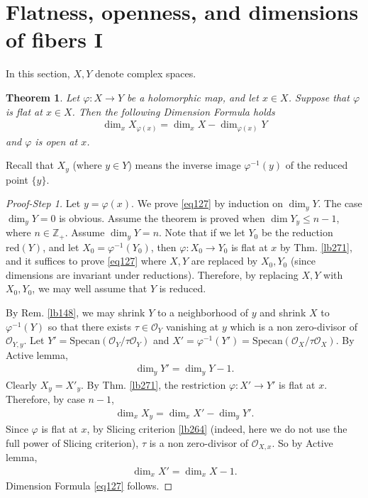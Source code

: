 \documentclass[12pt,b5paper,notitlepage]{report}
\theoremstyle{definition}
\theoremstyle{plain}
\newtheorem{thm}[df]{Theorem}
\newcommand{\scr}{\mathscr}
\newcommand{\Zbb}{\mathbb Z}
\newcommand{\Specan}{\mathrm{Specan}}
\newcommand{\red}{\mathrm{red}}
\numberwithin{equation}{section}
\begin{document}
\section{Flatness, openness, and dimensions of fibers I}


In this section, $X,Y$ denote complex spaces.

\begin{thm}\label{lb286}
Let $\varphi:X\rightarrow Y$ be a holomorphic map, and let $x\in X$. Suppose that $\varphi$ is flat at $x\in X$. Then the following Dimension Formula holds
\begin{align}
\dim_x X_{\varphi(x)}=\dim_x X-\dim_{\varphi(x)} Y\label{eq127}
\end{align}
and $\varphi$ is open at $x$.
\end{thm}

Recall that $X_y$ (where $y\in Y$) means the inverse image $\varphi^{-1}(y)$ of the reduced point $\{y\}$.
\begin{proof}[Proof-Step 1]
Let $y=\varphi(x)$. We prove \eqref{eq127} by induction on $\dim_y Y$. The case $\dim_y Y=0$ is obvious. Assume the theorem is proved when $\dim Y_y\leq n-1$, where $n\in\Zbb_+$. Assume $\dim_y Y=n$. Note that if we let $Y_0$ be the reduction $\red(Y)$, and let $X_0=\varphi^{-1}(Y_0)$, then $\varphi:X_0\rightarrow Y_0$ is flat at $x$ by Thm. \ref{lb271}, and it suffices to prove \eqref{eq127} where $X,Y$ are replaced by $X_0,Y_0$ (since dimensions are invariant under reductions). Therefore, by replacing $X,Y$ with $X_0,Y_0$, we may well assume that $Y$ is reduced.

By Rem. \ref{lb148}, we may shrink $Y$ to a neighborhood of $y$ and shrink $X$ to $\varphi^{-1}(Y)$ so that there exists $\tau\in\scr O_Y$ vanishing at $y$ which is a non zero-divisor of $\scr O_{Y,y}$. Let $Y'=\Specan(\scr O_Y/\tau\scr O_Y)$ and $X'=\varphi^{-1}(Y')=\Specan(\scr O_X/\tau\scr O_X)$. By Active lemma, 
\begin{align*}
\dim_y Y'=\dim_yY-1.
\end{align*}
Clearly $X_y=X'_y$. By Thm. \ref{lb271}, the restriction $\varphi:X'\rightarrow Y'$ is flat at $x$. Therefore, by case $n-1$,
\begin{align*}
\dim_x X_y=\dim_x X'-\dim_yY'.
\end{align*}
Since $\varphi$ is flat at $x$, by Slicing criterion \ref{lb264} (indeed, here we do not use the full power of Slicing criterion), $\tau$ is a non zero-divisor of $\scr O_{X,x}$. So by Active lemma, 
\begin{align*}
\dim_xX'=\dim_x X-1.
\end{align*}
Dimension Formula \eqref{eq127} follows.
\end{proof}
\end{document}
